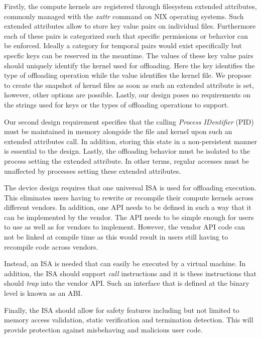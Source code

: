 Firstly, the compute kernels are registered through filesystem extended
attributes, commonly managed with the \textit{xattr} command on NIX operating
systems\footnotemark[10]. Such extended attributes allow to store key value
pairs on individual files. Furthermore each of these pairs is categorized such
that specific permissions or behavior can be enforced. Ideally a category for
temporal pairs would exist specifically but specfic keys can be reserved in the
meantime. The values of these key value pairs should uniquely identify the
kernel used for offloading. Here the key identifies the type of offloading
operation while the value identifies the kernel file. We propose to create the
snapshot of kernel files as soon as such an extended attribute is set, however,
other options are possible. Lastly, our design poses no requirements on the
strings used for keys or the types of offloading operations to support.


Our second design requirement specifies that the calling
\textit{Process IDentifier} (PID) must be maintained in memory alongside the
file and kernel upon such an extended attributes call. In addition, storing this
state in a non-persistent manner is essential to the design. Lastly, the
offloading behavior must be isolated to the process setting the extended
attribute. In other terms, regular accesses must be unaffected by processes
setting these extended attributes.

The device design requires that one universal ISA is used for offloading
execution. This eliminates users having to rewrite or recompile their compute
kernels across different vendors. In addition, one API needs to be defined in
such a way that it can be implemented by the vendor. The API needs to be
simple enough for users to use as well as for vendors to implement. However, the
vendor API code can not be linked at compile time as this would result in users
still having to recompile code across vendors.

Instead, an ISA is needed that can easily be executed by a virtual machine. In
addition, the ISA should support \textit{call} instructions and it is these
instructions that should \textit{trap} into the vendor API. Such an interface
that is defined at the binary level is known as an ABI.

Finally, the ISA should allow for safety features including but not limited to 
memory access validation, static verification and termination detection.
This will provide protection against misbehaving and malicious user code.

